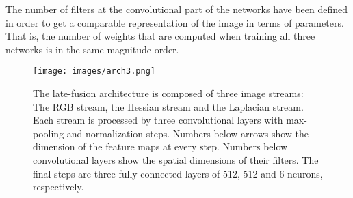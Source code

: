 \documentclass[review,12pt,3p]{elsarticle}
\begin{document}
The number of filters at the convolutional part of the networks have been defined in order to get a comparable representation of the image in terms of parameters. That is, the number of weights that are computed when training all three networks is in the same magnitude order.


\begin{figure*}
\centering
\texttt{[image: images/arch3.png]}
\caption{The late-fusion architecture is composed of three image streams: The RGB stream, the Hessian stream and the Laplacian stream. Each stream is processed by three convolutional layers with max-pooling and normalization steps. Numbers below arrows show the dimension of the feature maps at every step. Numbers below convolutional layers show the spatial dimensions of their filters. The final steps are three fully connected layers of 512, 512 and 6 neurons, respectively. }
\label{fig:CNN_Architecture}
\end{figure*}
\end{document}
